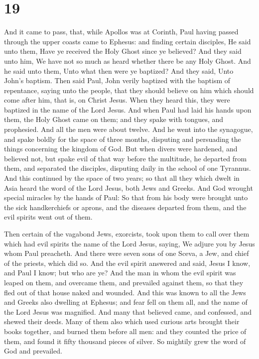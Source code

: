 \hypertarget{section-18}{%
\section{19}\label{section-18}}

 And it came to pass, that, while Apollos was at Corinth,
Paul having passed through the upper coasts came to Ephesus: and finding
certain disciples,  He said unto them, Have ye received
the Holy Ghost since ye believed? And they said unto him, We have not so
much as heard whether there be any Holy Ghost.  And he
said unto them, Unto what then were ye baptized? And they said, Unto
John's baptism.  Then said Paul, John verily baptized with
the baptism of repentance, saying unto the people, that they should
believe on him which should come after him, that is, on Christ Jesus.
 When they heard this, they were baptized in the name of
the Lord Jesus.  And when Paul had laid his hands upon
them, the Holy Ghost came on them; and they spake with tongues, and
prophesied.  And all the men were about twelve.
 And he went into the synagogue, and spake boldly for the
space of three months, disputing and persuading the things concerning
the kingdom of God.  But when divers were hardened, and
believed not, but spake evil of that way before the multitude, he
departed from them, and separated the disciples, disputing daily in the
school of one Tyrannus.  And this continued by the space
of two years; so that all they which dwelt in Asia heard the word of the
Lord Jesus, both Jews and Greeks.  And God wrought
special miracles by the hands of Paul:  So that from his
body were brought unto the sick handkerchiefs or aprons, and the
diseases departed from them, and the evil spirits went out of them.

 Then certain of the vagabond Jews, exorcists, took upon
them to call over them which had evil spirits the name of the Lord
Jesus, saying, We adjure you by Jesus whom Paul preacheth.
 And there were seven sons of one Sceva, a Jew, and chief
of the priests, which did so.  And the evil spirit
answered and said, Jesus I know, and Paul I know; but who are ye?
 And the man in whom the evil spirit was leaped on them,
and overcame them, and prevailed against them, so that they fled out of
that house naked and wounded.  And this was known to all
the Jews and Greeks also dwelling at Ephesus; and fear fell on them all,
and the name of the Lord Jesus was magnified.  And many
that believed came, and confessed, and shewed their deeds.
 Many of them also which used curious arts brought their
books together, and burned them before all men: and they counted the
price of them, and found it fifty thousand pieces of silver.
 So mightily grew the word of God and prevailed.

